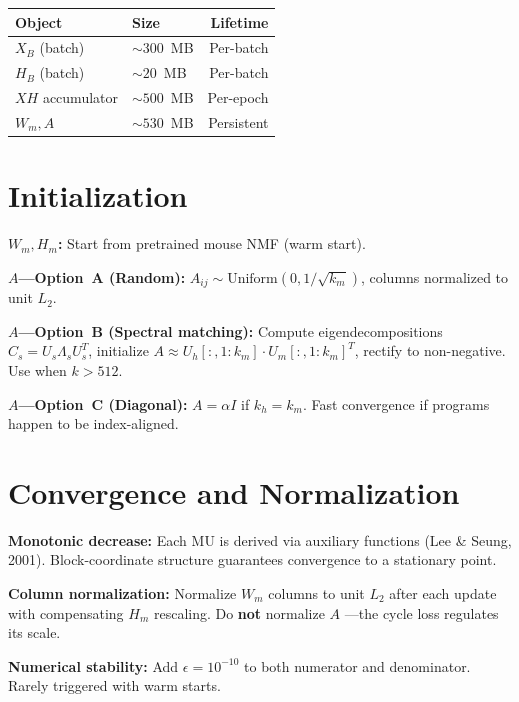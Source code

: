 \documentclass[10pt,twocolumn,letterpaper]{article}
\begin{document}
\begin{table}[h]
\centering\small
\begin{tabular}{@{}llr@{}}
\toprule
Object & Size & Lifetime \\
\midrule
$X_B$ (batch) & ${\sim}300$~MB & Per-batch \\
$H_B$ (batch) & ${\sim}20$~MB & Per-batch \\
$XH$ accumulator & ${\sim}500$~MB & Per-epoch \\
$W_m, A$ & ${\sim}530$~MB & Persistent \\
\bottomrule
\end{tabular}
\end{table}

\section{Initialization}

\textbf{$W_m, H_m$:} Start from pretrained mouse NMF (warm start).

\textbf{$A$---Option~A (Random):} $A_{ij} \sim \text{Uniform}(0, 1/\sqrt{k_m})$,
columns normalized to unit $L_2$.

\textbf{$A$---Option~B (Spectral matching):} Compute eigendecompositions
$C_s = U_s \Lambda_s U_s^T$, initialize
$A \approx U_h[:,1{:}k_m] \cdot U_m[:,1{:}k_m]^T$, rectify to non-negative.
Use when $k > 512$.

\textbf{$A$---Option~C (Diagonal):} $A = \alpha I$ if $k_h = k_m$. Fast
convergence if programs happen to be index-aligned.

\section{Convergence and Normalization}

\textbf{Monotonic decrease:} Each MU is derived via auxiliary functions
(Lee \& Seung, 2001). Block-coordinate structure guarantees convergence to a
stationary point.

\textbf{Column normalization:} Normalize $W_m$ columns to unit $L_2$ after
each update with compensating $H_m$ rescaling. Do \textbf{not} normalize $A$
---the cycle loss regulates its scale.

\textbf{Numerical stability:} Add $\epsilon = 10^{-10}$ to both numerator and
denominator. Rarely triggered with warm starts.
\end{document}
